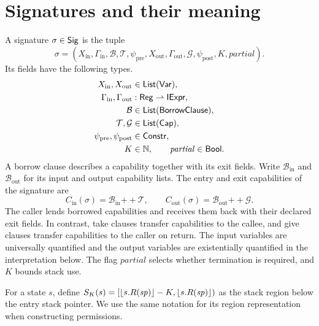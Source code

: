 \section{Signatures and their meaning}\label{sec:sigs}
\begin{definition}\label{def:sig}
A signature $\sigma\in\mathsf{Sig}$ is the tuple
\[\sigma=(X_{\mathrm{in}},\Gamma_{\mathrm{in}},\mathcal B,\mathcal T,\psi_{\mathrm{pre}},X_{\mathrm{out}},\Gamma_{\mathrm{out}},\mathcal G,\psi_{\mathrm{post}},K,\mathit{partial}).\]
Its fields have the following types.
\[
\begin{aligned}
X_{\mathrm{in}},X_{\mathrm{out}}&\in\mathsf{List}(\mathsf{Var}),\\
\Gamma_{\mathrm{in}},\Gamma_{\mathrm{out}}&:\mathsf{Reg}\rightharpoonup\mathsf{IExpr},\\
\mathcal B&\in\mathsf{List}(\mathsf{BorrowClause}),\\
\mathcal T,\mathcal G&\in\mathsf{List}(\mathsf{Cap}),\\
\psi_{\mathrm{pre}},\psi_{\mathrm{post}}&\in\mathsf{Constr},\\
K&\in\mathbb{N},\qquad\mathit{partial}\in\mathsf{Bool}.
\end{aligned}
\]
A borrow clause describes a capability together with its exit fields. Write $\mathcal B_{\mathrm{in}}$ and $\mathcal B_{\mathrm{out}}$ for its input and output capability lists. The entry and exit capabilities of the signature are
\[C_{\mathrm{in}}(\sigma)=\mathcal B_{\mathrm{in}}\mathbin{+\!+}\mathcal T,\qquad C_{\mathrm{out}}(\sigma)=\mathcal B_{\mathrm{out}}\mathbin{+\!+}\mathcal G.\]
The caller lends borrowed capabilities and receives them back with their declared exit fields. In contrast, take clauses transfer capabilities to the callee, and give clauses transfer capabilities to the caller on return. The input variables are universally quantified and the output variables are existentially quantified in the interpretation below. The flag $\mathit{partial}$ selects whether termination is required, and $K$ bounds stack use.
\end{definition}

For a state $s$, define $S_K(s)=[\lfloor s.R(\mathit{sp})\rfloor-K,\lfloor s.R(\mathit{sp})\rfloor)$ as the stack region below the entry stack pointer. We use the same notation for its region representation when constructing permissions.

